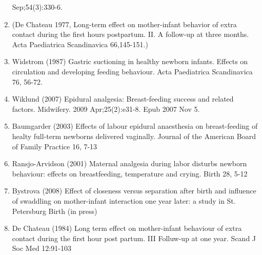 \documentclass[]{article}
\begin{document}
\begin{enumerate}
  Sep;54(3):330-6.
\item
  (De Chateau 1977, Long-term effect on mother-infant behavior of extra
  contact during the first hours postpartum. II. A follow-up at three
  months. Acta Paediatrica Scandinavica 66,145-151.)
\item
  Widstrom (1987) Gastric suctioning in healthy newborn infants. Effects
  on circulation and developing feeding behaviour. Acta Paediatrica
  Scandinavica 76, 56-72.
\item
  Wiklund (2007) Epidural analgesia: Breast-feeding success and related
  factors. Midwifery. 2009 Apr;25(2):e31-8. Epub 2007 Nov 5.
\item
  Baumgarder (2003) Effects of labour epidural anaesthesia on
  breast-feeding of healty full-term newborns delivered vaginally.
  Journal of the American Board of Family Practice 16, 7-13
\item
  Ransjo-Arvidson (2001) Maternal analgesia during labor disturbs
  newborn behaviour: effects on breastfeeding, temperature and crying.
  Birth 28, 5-12
\item
  Bystrova (2008) Effect of closeness versus separation after birth and
  influence of swaddling on mother-infant interaction one year later: a
  study in St. Petersburg Birth (in press)
\item
  De Chateau (1984) Long term effect on mother-infant behaviour of extra
  contact during the first hour post partum. III Folluw-up at one year.
  Scand J Soc Med 12:91-103
\end{enumerate}
\end{document}
